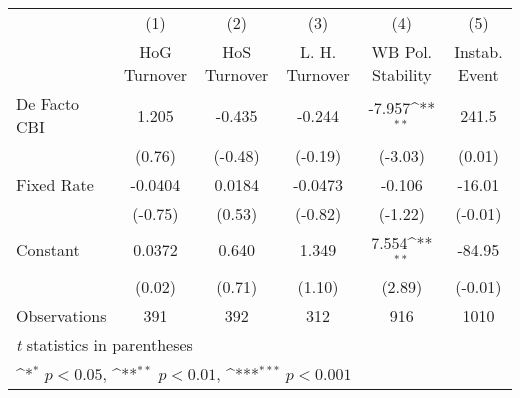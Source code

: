 \begin{table}[htbp]\centering
\def\sym#1{\ifmmode^{#1}\else\(^{#1}\)\fi}
\caption{\label{lowKIfivs2}}
\begin{tabular}{l*{5}{c}}
\toprule
                                        &\multicolumn{1}{c}{(1)}&\multicolumn{1}{c}{(2)}&\multicolumn{1}{c}{(3)}&\multicolumn{1}{c}{(4)}&\multicolumn{1}{c}{(5)}\\
                                        &\multicolumn{1}{c}{HoG Turnover}&\multicolumn{1}{c}{HoS Turnover}&\multicolumn{1}{c}{L. H. Turnover}&\multicolumn{1}{c}{WB Pol. Stability}&\multicolumn{1}{c}{Instab. Event}\\
\midrule
De Facto CBI                            &    1.205         &   -0.435         &   -0.244         &   -7.957\sym{**} &    241.5         \\
                                        &   (0.76)         &  (-0.48)         &  (-0.19)         &  (-3.03)         &   (0.01)         \\
\addlinespace
Fixed Rate                              &  -0.0404         &   0.0184         &  -0.0473         &   -0.106         &   -16.01         \\
                                        &  (-0.75)         &   (0.53)         &  (-0.82)         &  (-1.22)         &  (-0.01)         \\
\addlinespace
Constant                                &   0.0372         &    0.640         &    1.349         &    7.554\sym{**} &   -84.95         \\
                                        &   (0.02)         &   (0.71)         &   (1.10)         &   (2.89)         &  (-0.01)         \\
\midrule
Observations                            &      391         &      392         &      312         &      916         &     1010         \\
\bottomrule
\multicolumn{6}{l}{\footnotesize \textit{t} statistics in parentheses}\\
\multicolumn{6}{l}{\footnotesize \sym{*} \(p<0.05\), \sym{**} \(p<0.01\), \sym{***} \(p<0.001\)}\\
\end{tabular}
\end{table}
